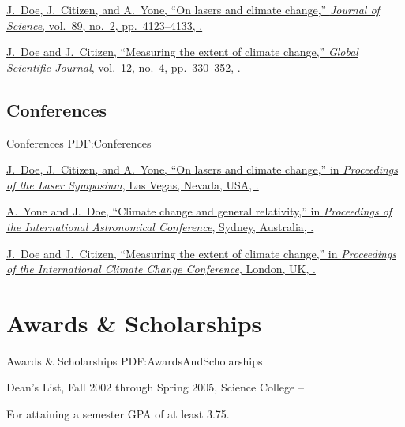 \documentclass[letterpaper,MMMyyyy,nonstop]{simpleresumecv}
\begin{document}
\begin{body}
\GapNoBreak
\NumberedItem{[11]}
\href{http://www.example.com/my-paper-doi-5}
{\underline{J.~Doe}, J.~Citizen, and A.~Yone,
``On lasers and climate change,''
\textit{Journal of Science},
vol.~89,
no.~2,
pp.~4123--4133,
.}

\Gap
\NumberedItem{{\CharSpace}[1]}
\href{http://www.example.com/my-paper-doi-4}
{\underline{J.~Doe} and J.~Citizen,
``Measuring the extent of climate change,''
\textit{Global Scientific Journal},
vol.~12,
no.~4,
pp.~330--352,
.}

\BigGap
\subsection
{Conferences}
{Conferences}
{PDF:Conferences}

\GapNoBreak
\NumberedItem{[11]}
\href{http://www.example.com/my-paper-doi-3}
{\underline{J.~Doe}, J.~Citizen, and A.~Yone,
``On lasers and climate change,''
in \textit{Proceedings of the Laser Symposium},
Las Vegas, Nevada, USA,
.}

\Gap
\NumberedItem{[10]}
\href{http://www.example.com/my-paper-doi-2}
{A.~Yone and \underline{J.~Doe},
``Climate change and general relativity,''
in \textit{Proceedings of the International Astronomical Conference},
Sydney, Australia,
.}

\Gap
\NumberedItem{{\CharSpace}[1]}
\href{http://www.example.com/my-paper-doi-1}
{\underline{J.~Doe} and J.~Citizen,
``Measuring the extent of climate change,''
in \textit{Proceedings of the International Climate Change Conference},
London, UK,
.}


\section
{Awards \&\newline
Scholarships}
{Awards \& Scholarships}
{PDF:AwardsAndScholarships}

\BulletItem
Dean's List,
Fall 2002 through Spring 2005,
Science College
\hfill
{} --
\begin{detail}
\SubItem
For attaining a semester GPA of at least 3.75.
\end{detail}


\end{body}
\end{document}

